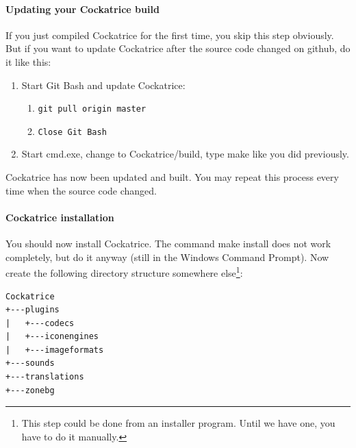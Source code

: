 \documentclass[a4paper]{scrbook}
\newcommand{\shellcmd}[1]{\texttt{\scriptsize #1}}
\begin{document}
\paragraph{Updating your Cockatrice build}
If you just compiled Cockatrice for the first time, you skip this step obviously.
But if you want to update Cockatrice after the source code changed on github, do it like this:
\begin{enumerate}
 \item Start Git Bash and update Cockatrice:
    \begin{enumerate}
     \item \shellcmd{git pull origin master}
     \item \shellcmd{Close Git Bash}
    \end{enumerate}
 \item Start cmd.exe, change to Cockatrice/build, type make like you did previously.
\end{enumerate}
Cockatrice has now been updated and built. You may repeat this process every time when the source code changed.

\paragraph{Cockatrice installation}
You should now install Cockatrice. The command make install does not work completely, but do it anyway (still in the Windows Command Prompt).
Now create the following directory structure somewhere else\footnote{This step could be done from an installer program. Until we have one, you have to do it manually.}:
\begin{verbatim}
Cockatrice
+---plugins
|   +---codecs
|   +---iconengines
|   +---imageformats
+---sounds
+---translations
+---zonebg
\end{verbatim}
\end{document}
